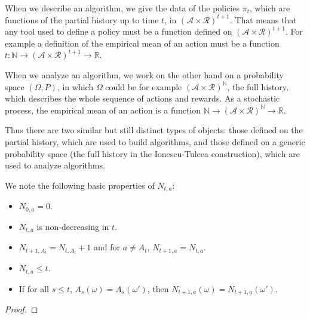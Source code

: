 \begin{remark}
When we describe an algorithm, we give the data of the policies $\pi_t$, which are functions of the partial history up to time $t$, in $(\mathcal{A} \times \mathcal{R})^{t+1}$.
That means that any tool used to define a policy must be a function defined on $(\mathcal{A} \times \mathcal{R})^{t+1}$.
For example a definition of the empirical mean of an action must be a function $t : \mathbb{N} \to (\mathcal{A} \times \mathcal{R})^{t+1} \to \mathbb{R}$.

When we analyze an algorithm, we work on the other hand on a probability space $(\Omega, P)$, in which $\Omega$ could be for example $(\mathcal{A} \times \mathcal{R})^{\mathbb{N}}$, the full history, which describes the whole sequence of actions and rewards.
As a stochastic process, the empirical mean of an action is a function $\mathbb{N} \to (\mathcal{A} \times \mathcal{R})^{\mathbb{N}} \to \mathbb{R}$.

Thus there are two similar but still distinct types of objects: those defined on the partial history, which are used to build algorithms, and those defined on a generic probability space (the full history in the Ionescu-Tulcea construction), which are used to analyze algorithms.
\end{remark}


\begin{lemma}\label{lem:pullCount_basic}
  \leanok
We note the following basic properties of $N_{t,a}$:
\begin{itemize}
  \item $N_{0,a} = 0$.
  \item $N_{t,a}$ is non-decreasing in $t$.
  \item $N_{t + 1, A_t} = N_{t, A_t} + 1$ and for $a \ne A_t$, $N_{t + 1, a} = N_{t, a}$.
  \item $N_{t, a} \le t$.
  \item If for all $s \le t$, $A_s(\omega) = A_s(\omega')$, then $N_{t+1, a}(\omega) = N_{t+1, a}(\omega')$.
\end{itemize}
\end{lemma}

\begin{proof}\leanok

\end{proof}


